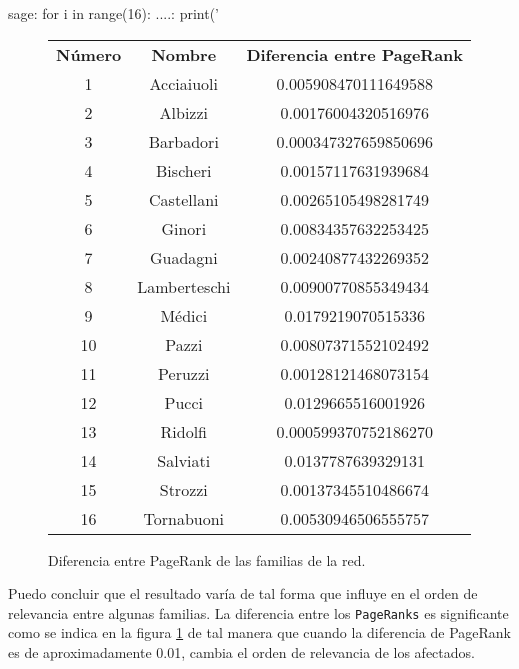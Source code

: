 \begin{sagecommandline}
    sage: for i in range(16):
    ....:   print('%
\end{sagecommandline}
\begin{figure}[H]
    \centering
    \begin{tabular}{|c|c|c|}
        \hline
        \rowcolor{azul} \multicolumn{2}{|c|}{\textbf{Familia}}& \\ \hline
        \rowcolor{azul} \textbf{Número} & \textbf{Nombre} & \textbf{Diferencia entre PageRank} \\ \hline
        1 & Acciaiuoli & 0.005908470111649588 \\ \hline
        2 & Albizzi & 0.00176004320516976 \\ \hline
        3 & Barbadori & 0.000347327659850696 \\ \hline
        4 & Bischeri & 0.00157117631939684 \\ \hline
        5 & Castellani & 0.00265105498281749 \\ \hline
        6 & Ginori & 0.00834357632253425 \\ \hline
        7 & Guadagni & 0.00240877432269352 \\ \hline
        8 & Lamberteschi & 0.00900770855349434 \\ \hline
        9 & Médici & 0.0179219070515336 \\ \hline
        10 & Pazzi & 0.00807371552102492 \\ \hline
        11 & Peruzzi & 0.00128121468073154 \\ \hline
        12 & Pucci & 0.0129665516001926 \\ \hline
        13 & Ridolfi & 0.000599370752186270 \\ \hline
        14 & Salviati & 0.0137787639329131 \\ \hline
        15 & Strozzi & 0.00137345510486674 \\ \hline
        16 & Tornabuoni & 0.00530946506555757 \\ \hline
    \end{tabular}
    \caption{Diferencia entre PageRank de las familias de la red.}
    \label{fig:pageRankFamiliasDiferencia}
\end{figure}

\par Puedo concluir que el resultado varía de tal forma que influye en el orden de relevancia entre algunas familias. La diferencia entre los \texttt{PageRanks} 
es significante como se indica en la figura \ref{fig:pageRankFamiliasDiferencia} de tal manera que cuando la diferencia de PageRank es de aproximadamente 0.01,
cambia el orden de relevancia de los afectados.

